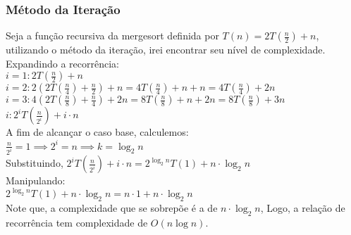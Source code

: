 \subsubsection{Método da Iteração}
Seja a função recursiva da mergesort definida por $T(n) = 2T(\frac{n}{2}) + n$, utilizando o método da iteração, irei encontrar seu nível de complexidade. \\
Expandindo a recorrência:\\
$i = 1 : 2T(\frac{n}{2}) + n$ \\
$i = 2 : 2(2T(\frac{n}{4}) + \frac{n}{2}) + n = 4T(\frac{n}{4}) + n + n = 4T(\frac{n}{4}) + 2n$ \\
$i = 3 : 4(2T(\frac{n}{8}) + \frac{n}{4}) + 2n = 8T(\frac{n}{8}) + n + 2n = 8T(\frac{n}{8}) + 3n$ \\
$i : 2^iT(\frac{n}{2^i}) + i\cdot n$ \\
A fim de alcançar o caso base, calculemos: \\
$\frac{n}{2^i} = 1 \implies 2^i = n \implies k = \log_{2}{n}$ \\
Substituindo, $2^iT(\frac{n}{2^i}) + i\cdot n = 2^{\log_{2}{n}}T(1) + n \cdot \log_{2}{n}$ \\
Manipulando: \\
$2^{\log_{2}{n}}T(1) + n \cdot \log_{2}{n} = n \cdot 1 + n \cdot \log_{2}{n}$ \\
Note que, a complexidade que se sobrepõe é a de $n\cdot \log_{2}{n}$, Logo, a relação de recorrência tem complexidade de $O(n\log{n})$.